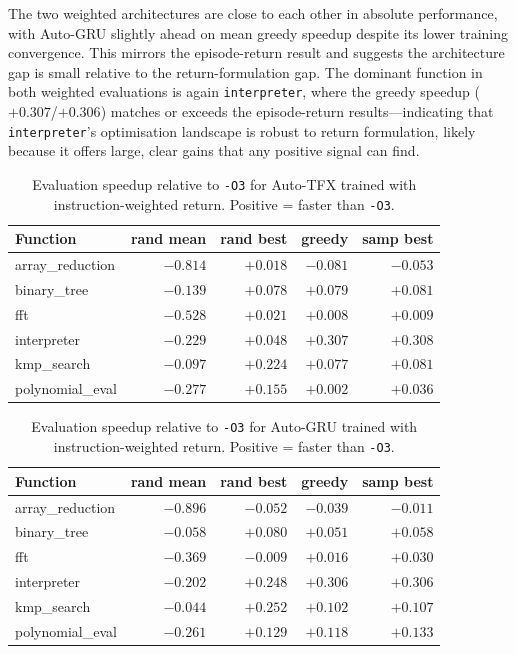 \documentclass[conference]{IEEEtran}
\newcommand{\opt}[1]{\texttt{-O#1}}
\begin{document}
The two weighted architectures are close to each other in absolute performance,
with Auto-GRU slightly ahead on mean greedy speedup despite its lower training
convergence.
This mirrors the episode-return result and suggests the architecture gap is
small relative to the return-formulation gap.
The dominant function in both weighted evaluations is again
\texttt{interpreter}, where the greedy speedup ($+0.307$/$+0.306$) matches
or exceeds the episode-return results---indicating that \texttt{interpreter}'s
optimisation landscape is robust to return formulation, likely because it
offers large, clear gains that any positive signal can find.

\begin{table}[t]
\caption{Evaluation speedup relative to \opt{3} for Auto-TFX trained with
instruction-weighted return. Positive = faster than \opt{3}.}
\label{tab:eval-tfx-weighted}
\centering
\setlength{\tabcolsep}{4pt}
\begin{tabular}{lrrrr}
\toprule
Function & rand mean & rand best & greedy & samp best \\
\midrule
array\_reduction & $-0.814$ & $+0.018$ & $-0.081$ & $-0.053$ \\
binary\_tree     & $-0.139$ & $+0.078$ & $+0.079$ & $+0.081$ \\
fft              & $-0.528$ & $+0.021$ & $+0.008$ & $+0.009$ \\
interpreter      & $-0.229$ & $+0.048$ & $+0.307$ & $+0.308$ \\
kmp\_search      & $-0.097$ & $+0.224$ & $+0.077$ & $+0.081$ \\
polynomial\_eval & $-0.277$ & $+0.155$ & $+0.002$ & $+0.036$ \\
\bottomrule
\end{tabular}
\end{table}

\begin{table}[t]
\caption{Evaluation speedup relative to \opt{3} for Auto-GRU trained with
instruction-weighted return. Positive = faster than \opt{3}.}
\label{tab:eval-gru-weighted}
\centering
\setlength{\tabcolsep}{4pt}
\begin{tabular}{lrrrr}
\toprule
Function & rand mean & rand best & greedy & samp best \\
\midrule
array\_reduction & $-0.896$ & $-0.052$ & $-0.039$ & $-0.011$ \\
binary\_tree     & $-0.058$ & $+0.080$ & $+0.051$ & $+0.058$ \\
fft              & $-0.369$ & $-0.009$ & $+0.016$ & $+0.030$ \\
interpreter      & $-0.202$ & $+0.248$ & $+0.306$ & $+0.306$ \\
kmp\_search      & $-0.044$ & $+0.252$ & $+0.102$ & $+0.107$ \\
polynomial\_eval & $-0.261$ & $+0.129$ & $+0.118$ & $+0.133$ \\
\bottomrule
\end{tabular}
\end{table}
\end{document}
